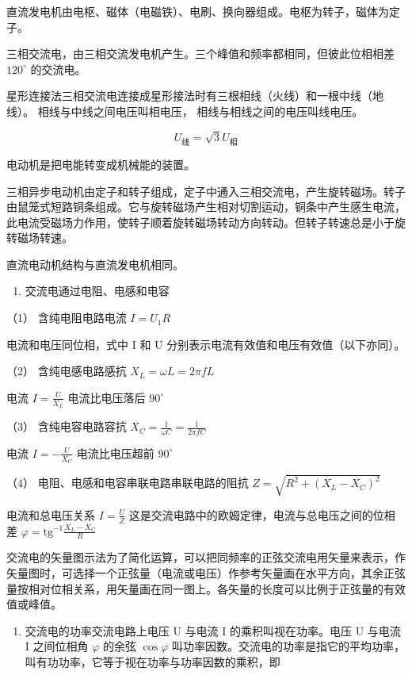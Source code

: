 直流发电机由电枢、磁体（电磁铁）、电刷、换向器组成。电枢为转子，磁体为定子。

三相交流电，由三相交流发电机产生。三个峰值和频率都相同，但彼此位相相差
\(120^{\circ}\) 的交流电。

星形连接法三相交流电连接成星形接法时有三根相线（火线）和一根中线（地线）。
相线与中线之间电压叫相电压， 相线与相线之间的电压叫线电压。

\[
U_{\mathrm{线}} = \sqrt{3} U_{\mathrm{相}}
\]

电动机是把电能转变成机械能的装置。

三相异步电动机由定子和转子组成，定子中通入三相交流电，产生旋转磁场。转子由鼠笼式短路铜条组成。它与旋转磁场产生相对切割运动，铜条中产生感生电流，此电流受磁场力作用，使转子顺着旋转磁场转动方向转动。但转子转速总是小于旋转磁场转速。

直流电动机结构与直流发电机相同。

\begin{enumerate}
\def\labelenumi{\arabic{enumi}.}
\setcounter{enumi}{2}
\tightlist
\item
  交流电通过电阻、电感和电容
\end{enumerate}

（1） 含纯电阻电路电流 \(I = U_{1} R\)

电流和电压同位相，式中 I 和 U
分别表示电流有效值和电压有效值（以下亦同）。

（2） 含纯电感电路感抗 \(X_{L} = \omega L = 2\pi fL\)

电流 \(I=\frac{U}{X_{L}}\) 电流比电压落后 \(90^{\circ}\)

（3） 含纯电容电路容抗
\(X_{C} = \frac{1}{\omega C} = \frac{1}{2\pi fC}\)

电流 \(I = -\frac{U}{X_{C}}\) 电流比电压超前 \(90^{\circ}\)

（4） 电阻、电感和电容串联电路串联电路的阻抗
\(Z = \sqrt{R^2 + (X_L - X_C)^2}\)

电流和总电压关系 \(I = \frac{U}{Z}\)
这是交流电路中的欧姆定律，电流与总电压之间的位相差
\(\varphi = \mathrm{tg}^{-1}\frac{X_L - X_C}{R}\)

交流电的矢量图示法为了简化运算，可以把同频率的正弦交流电用矢量来表示，作矢量图时，可选择一个正弦量（电流或电压）作参考矢量画在水平方向，其余正弦量按相对位相关系，用矢量画在同一图上。各矢量的长度可以比例于正弦量的有效值或峰值。

\begin{enumerate}
\def\labelenumi{\arabic{enumi}.}
\setcounter{enumi}{3}
\tightlist
\item
  交流电的功率交流电路上电压 U 与电流 I 的乘积叫视在功率。电压 U 与电流
  I 之间位相角 \(\varphi\) 的余弦 \(\cos\varphi\)
  叫功率因数。交流电的功率是指它的平均功率，叫有功功率，它等于视在功率与功率因数的乘积，即
\end{enumerate}

